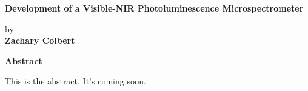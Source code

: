 \thispagestyle{plain}
\begin{center}
    \Large \textbf{Development of a Visible-NIR Photoluminescence Microspectrometer}
 
    \vspace{0.4cm}
    by \\
    \textbf{Zachary Colbert}
 
    \vspace{0.9cm}
    \textbf{Abstract}
\end{center}

This is the abstract. It's coming soon.